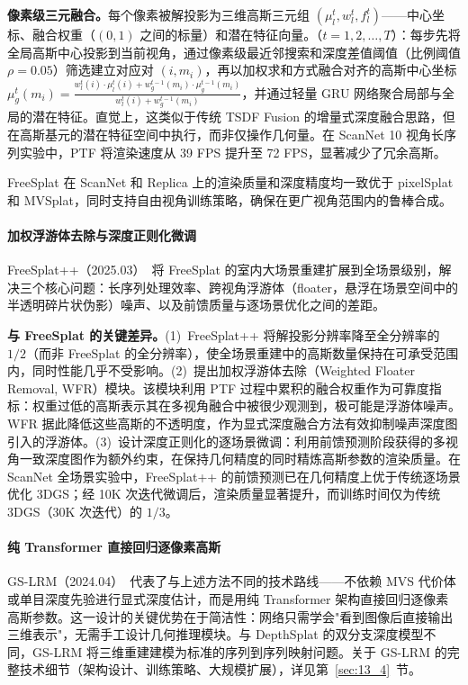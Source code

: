 \textbf{像素级三元融合。}每个像素被解投影为三维高斯三元组 $(\mu_l^t, w_l^t, f_l^t)$——中心坐标、融合权重（$(0,1)$ 之间的标量）和潜在特征向量。（$t{=}1, 2, \ldots, T$）：每步先将全局高斯中心投影到当前视角，通过像素级最近邻搜索和深度差值阈值（比例阈值 $\rho{=}0.05$）筛选建立对应对 $(i, m_i)$，再以加权求和方式融合对齐的高斯中心坐标 $\mu_g^t(m_i) = \frac{w_l^t(i) \cdot \mu_l^t(i) + w_g^{t-1}(m_i) \cdot \mu_g^{t-1}(m_i)}{w_l^t(i) + w_g^{t-1}(m_i)}$，并通过轻量 GRU 网络聚合局部与全局的潜在特征。直觉上，这类似于传统 TSDF Fusion 的增量式深度融合思路，但在高斯基元的潜在特征空间中执行，而非仅操作几何量。在 ScanNet 10 视角长序列实验中，PTF 将渲染速度从 39 FPS 提升至 72 FPS，显著减少了冗余高斯。

FreeSplat 在 ScanNet 和 Replica 上的渲染质量和深度精度均一致优于 pixelSplat 和 MVSplat，同时支持自由视角训练策略，确保在更广视角范围内的鲁棒合成。

\paragraph{加权浮游体去除与深度正则化微调}

FreeSplat++（2025.03）~\cite{2503_22986}将 FreeSplat 的室内大场景重建扩展到全场景级别，解决三个核心问题：长序列处理效率、跨视角浮游体（floater，悬浮在场景空间中的半透明碎片状伪影）噪声、以及前馈质量与逐场景优化之间的差距。

\textbf{与 FreeSplat 的关键差异。}(1)~FreeSplat++ 将解投影分辨率降至全分辨率的 $1/2$（而非 FreeSplat 的全分辨率），使全场景重建中的高斯数量保持在可承受范围内，同时性能几乎不受影响。(2)~提出加权浮游体去除（Weighted Floater Removal, WFR）模块。该模块利用 PTF 过程中累积的融合权重作为可靠度指标：权重过低的高斯表示其在多视角融合中被很少观测到，极可能是浮游体噪声。WFR 据此降低这些高斯的不透明度，作为显式深度融合方法有效抑制噪声深度图引入的浮游体。(3)~设计深度正则化的逐场景微调：利用前馈预测阶段获得的多视角一致深度图作为额外约束，在保持几何精度的同时精炼高斯参数的渲染质量。在 ScanNet 全场景实验中，FreeSplat++ 的前馈预测已在几何精度上优于传统逐场景优化 3DGS；经 10K 次迭代微调后，渲染质量显著提升，而训练时间仅为传统 3DGS（30K 次迭代）的 $1/3$。

\paragraph{纯 Transformer 直接回归逐像素高斯}

GS-LRM（2024.04）~\cite{2404_19702}代表了与上述方法不同的技术路线——不依赖 MVS 代价体或单目深度先验进行显式深度估计，而是用纯 Transformer 架构直接回归逐像素高斯参数。这一设计的关键优势在于简洁性：网络只需学会"看到图像后直接输出三维表示"，无需手工设计几何推理模块。与 DepthSplat 的双分支深度模型不同，GS-LRM 将三维重建建模为标准的序列到序列映射问题。关于 GS-LRM 的完整技术细节（架构设计、训练策略、大规模扩展），详见第~\ref{sec:13_4}~节。

